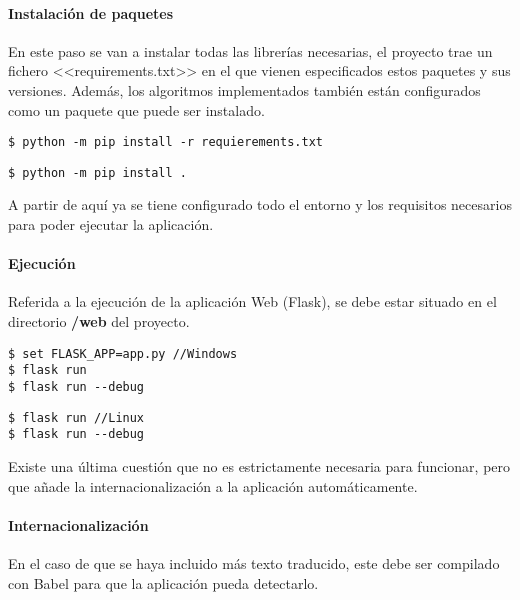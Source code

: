 \paragraph{Instalación de paquetes} En este paso se van a instalar todas las
librerías necesarias, el proyecto trae un fichero <<requirements.txt>> en el que
vienen especificados estos paquetes y sus versiones. Además, los algoritmos
implementados también están configurados como un paquete que puede ser
instalado.
\begin{tcolorbox}[colback=cyan!5!white,colframe=orange!75!black,title=Instalar librerías externas]
\begin{verbatim}
$ python -m pip install -r requierements.txt
\end{verbatim}
\end{tcolorbox}

\begin{tcolorbox}[colback=cyan!5!white,colframe=orange!75!black,title=Instalar paquete de algoritmos]
\begin{verbatim}
$ python -m pip install .
\end{verbatim}
\end{tcolorbox}
A partir de aquí ya se tiene configurado todo el entorno y los requisitos
necesarios para poder ejecutar la aplicación.

\paragraph{Ejecución} Referida a la ejecución de la aplicación Web (Flask), se
debe estar situado en el directorio \textbf{/web} del proyecto.
\begin{tcolorbox}[colback=cyan!5!white,colframe=cyan!75!black,fontupper=\footnotesize,fontlower=\footnotesize,title=Ejecución]
\begin{verbatim}
$ set FLASK_APP=app.py //Windows
$ flask run
$ flask run --debug
\end{verbatim}
\tcblower
\begin{verbatim}
$ flask run //Linux
$ flask run --debug
\end{verbatim}
\end{tcolorbox}

Existe una última cuestión que no es estrictamente necesaria para funcionar,
pero que añade la internacionalización a la aplicación automáticamente.

\paragraph{Internacionalización} En el caso de que se haya incluido más texto
traducido, este debe ser compilado con Babel para que la aplicación pueda
detectarlo.

